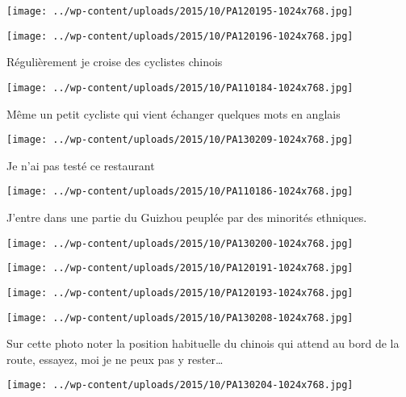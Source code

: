 \centerline{\texttt{[image: ../wp-content/uploads/2015/10/PA120195-1024x768.jpg]} } 
 \newline
 \newline
\centerline{\texttt{[image: ../wp-content/uploads/2015/10/PA120196-1024x768.jpg]} } 
 \newline
 Régulièrement je croise des cyclistes chinois \newline
 \newline
\centerline{\texttt{[image: ../wp-content/uploads/2015/10/PA110184-1024x768.jpg]} } 
 \newline
 Même un petit cycliste qui vient échanger quelques mots en anglais \newline
 \newline
\centerline{\texttt{[image: ../wp-content/uploads/2015/10/PA130209-1024x768.jpg]} } 
 \newline
 Je n'ai pas testé ce restaurant \newline
 \newline
\centerline{\texttt{[image: ../wp-content/uploads/2015/10/PA110186-1024x768.jpg]} } 
 \newline
 J'entre dans une partie du Guizhou peuplée par des minorités ethniques. \newline
 \newline
\centerline{\texttt{[image: ../wp-content/uploads/2015/10/PA130200-1024x768.jpg]} } 
 \newline
 \newline
\centerline{\texttt{[image: ../wp-content/uploads/2015/10/PA120191-1024x768.jpg]} } 
 \newline
 \newline
\centerline{\texttt{[image: ../wp-content/uploads/2015/10/PA120193-1024x768.jpg]} } 
 \newline
 \newline
\centerline{\texttt{[image: ../wp-content/uploads/2015/10/PA130208-1024x768.jpg]} } 
 \newline
 Sur cette photo noter la position habituelle du chinois qui attend au bord de la route, essayez, moi je ne peux pas y rester… \newline
 \newline
\centerline{\texttt{[image: ../wp-content/uploads/2015/10/PA130204-1024x768.jpg]} } 
 \newline

\newpage
 
